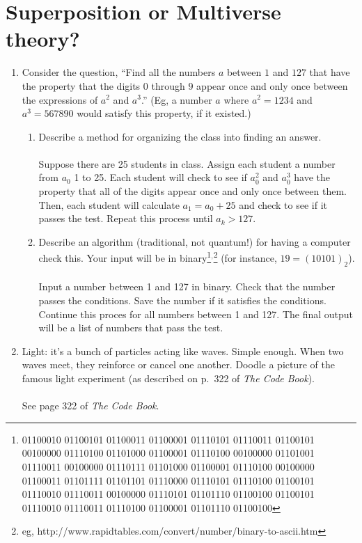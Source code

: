 \section{Superposition or Multiverse theory?}\label{sec:2}
\begin{enumerate}
\item \label{q:2.1} Consider the question, ``Find all the numbers $a$ between $1$ and $127$ that have the property that the digits $0$ through $9$ appear once and only once between the expressions of $a^2$ and $a^3$.''  (Eg, a number $a$ where $a^2 = 1234$ and $a^3 = 567890$ would satisfy this property, if it existed.)
\begin{enumerate}
\item Describe a method for organizing the class into finding an answer.
\\
\\Suppose there are 25 students in class. Assign each student a number from $a_0$ 1 to 25. Each student will check to see if $a_0^2$ and $a_0^3$ have the property that all of the digits appear once and only once between them. Then, each student will calculate $a_1 = a_0 + 25$ and check to see if it passes the test. Repeat this process until $a_k > 127$.  
\\
\item Describe an algorithm (traditional, not quantum!) for having a computer check this.  Your input will be in binary\footnote{01100010 01100101 01100011 01100001 01110101 01110011 01100101 00100000 01110100 01101000 01100001 01110100 00100000 01101001 01110011 00100000 01110111 01101000 01100001 01110100 00100000 01100011 01101111 01101101 01110000 01110101 01110100 01100101 01110010 01110011 00100000 01110101 01101110 01100100 01100101 01110010 01110011 01110100 01100001 01101110 01100100}$^{,}$\footnote{{eg, http://www.rapidtables.com/convert/number/binary-to-ascii.htm}} (for instance, $19 = (10101)_2$).
\\
\\Input a number between 1 and 127 in binary. Check that the number passes the conditions. Save the number if it satisfies the conditions. Continue this proces for all numbers between 1 and 127. The final output will be a list of numbers that pass the test.
\vfill
\end{enumerate}
\pagebreak
\item Light: it's a bunch of particles acting like waves.  Simple enough.  When two waves meet, they reinforce or cancel one another.  Doodle a picture of the famous light experiment (as described on p.\ 322 of \textit{The Code Book}).
\\
\\See page 322 of \textit{The Code Book}.\\




\end{enumerate}
